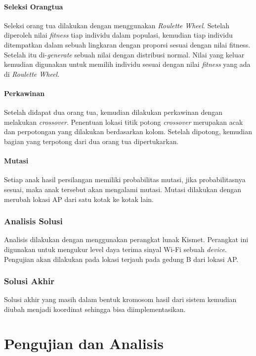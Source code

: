 \documentclass[12pt,a4paper]{report}
\begin{document}
		\subsubsection{Seleksi Orangtua}
		Seleksi orang tua dilakukan dengan menggunakan \emph{Roulette Wheel}. Setelah diperoleh nilai \emph{fitness} tiap individu dalam populasi, kemudian tiap individu ditempatkan dalam sebuah lingkaran dengan proporsi sesuai dengan nilai fitness. Setelah itu di-\emph{generate} sebuah nilai dengan distribusi normal. Nilai yang keluar kemudian digunakan untuk memilih individu sesuai dengan nilai \emph{fitness} yang ada di \emph{Roulette Wheel}.
		\subsubsection{Perkawinan}
		Setelah didapat dua orang tua, kemudian dilakukan perkawinan dengan melakukan \emph{crossover}. Penentuan lokasi titik potong \emph{crossover} merupakan acak dan perpotongan yang dilakukan berdasarkan kolom. Setelah dipotong, kemudian bagian yang terpotong dari dua orang tua dipertukarkan.
		\subsubsection{Mutasi}
		Setiap anak hasil persilangan memiliki probabilitas mutasi, jika probabilitasnya sesuai, maka anak tersebut akan mengalami mutasi. Mutasi dilakukan dengan merubah lokasi AP dari satu kotak ke kotak lain. 
		
		\subsection{Analisis Solusi}
		Analisis dilakukan dengan menggunakan perangkat lunak Kismet. Perangkat ini digunakan untuk mengukur level daya terima sinyal Wi-Fi sebuah \emph{device}. Pengujian akan dilakukan pada lokasi terjauh pada gedung B dari lokasi AP. 
		
		\subsection{Solusi Akhir}
		Solusi akhir yang masih dalam bentuk kromosom hasil dari sistem kemudian diubah menjadi koordinat sehingga bisa diimplementasikan.
		
		\newpage
		\chapter{Pengujian dan Analisis}
\end{document}

